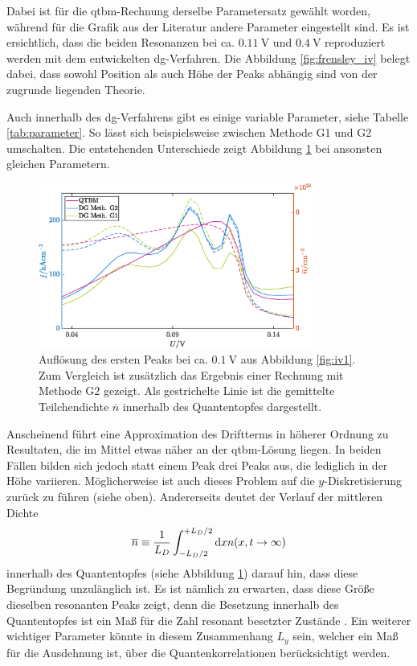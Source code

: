 Dabei ist für die \ac{qtbm}-Rechnung derselbe Parametersatz gewählt worden, während für die Grafik aus der Literatur \cite{frensley3} andere Parameter eingestellt sind. Es ist ersichtlich, dass die beiden Resonanzen bei ca. $\SI{0.11}{\volt}$ und $\SI{0.4}{\volt}$ reproduziert werden mit dem entwickelten \ac{dg}-Verfahren. Die Abbildung \ref{fig:frensley_iv} belegt dabei, dass sowohl Position als auch Höhe der Peaks abhängig sind von der zugrunde liegenden Theorie.

Auch innerhalb des \ac{dg}-Verfahrens gibt es einige variable Parameter, siehe Tabelle \ref{tab:parameter}. So lässt sich beispielsweise zwischen Methode G1 und G2 umschalten. Die entstehenden Unterschiede zeigt Abbildung \ref{fig:iv2} bei ansonsten gleichen Parametern.
\begin{figure}
  \centering
  \includegraphics[width=0.8\textwidth]{plots/IV/IV_qtbm_dg_fein.eps}
  \caption{Auflösung des ersten Peaks bei ca. $\SI{0.1}{\volt}$ aus Abbildung \ref{fig:iv1}. Zum Vergleich ist zusätzlich das Ergebnis einer Rechnung mit Methode G2 gezeigt. Als gestrichelte Linie ist die gemittelte Teilchendichte $\overline{n}$ innerhalb des Quantentopfes dargestellt.}
  \label{fig:iv2}
\end{figure}
Anscheinend führt eine Approximation des Driftterms in höherer Ordnung zu Resultaten, die im Mittel etwas näher an der \ac{qtbm}-Lösung liegen. In beiden Fällen bilden sich jedoch statt einem Peak drei Peaks aus, die lediglich in der Höhe variieren. Möglicherweise ist auch dieses Problem auf die $y$-Diskretisierung zurück zu führen (siehe oben). Andererseits deutet der Verlauf der mittleren Dichte
\begin{equation*}
  \overline{n} \equiv \frac{1}{L_D} \int_{-L_D/2}^{+L_D/2} \mathop{}\!\mathrm{d} x n(x,t\rightarrow\infty)
\end{equation*}
innerhalb des Quantentopfes (siehe Abbildung \ref{fig:iv2}) darauf hin, dass diese Begründung unzulänglich ist. Es ist nämlich zu erwarten, dass diese Größe dieselben resonanten Peaks zeigt, denn die Besetzung innerhalb des Quantentopfes ist ein Maß für die Zahl resonant besetzter Zustände \cite{frensley3}. Ein weiterer wichtiger Parameter könnte in diesem Zusammenhang $L_y$ sein, welcher ein Maß für die Ausdehnung ist, über die Quantenkorrelationen berücksichtigt werden.

